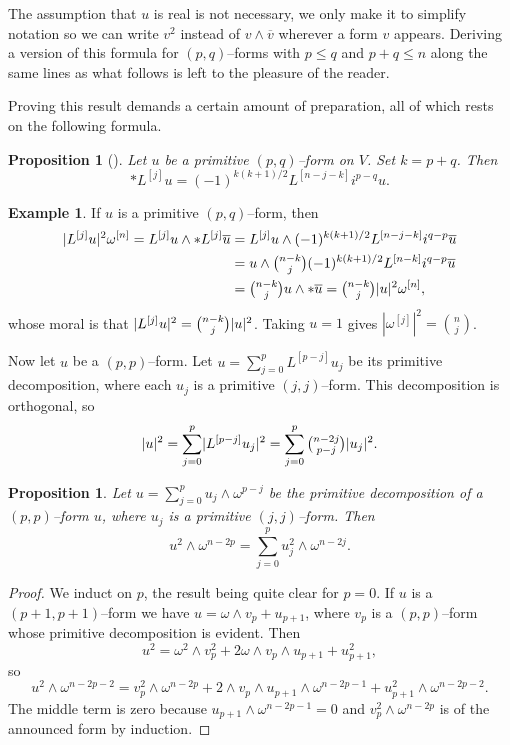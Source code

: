 \documentclass[11pt,a4paper]{amsart}
\def\^#1{^{[#1]}}
\newtheorem{prop}[theo]{Proposition}
\theoremstyle{definition}
\newtheorem{exam}[theo]{Example}
\numberwithin{equation}{section}
\begin{document}
The assumption that $u$ is real is not necessary, we only make it to
simplify notation so we can write $v^2$ instead of $v \wedge \overline v$
wherever a form $v$ appears. Deriving a version of this formula for
$(p,q)$--forms with $p \leq q$ and $p+q \leq n$ along the same lines as
what follows is left to the pleasure of the reader.

Proving this result demands a certain amount of preparation, all of which
rests on the following formula.


\begin{prop}[{{\cite[Proposition~1.67]{Huy}}}]
Let $u$ be a primitive $(p,q)$--form on $V$. Set $k = p+q$. Then
$$
    * L\^{j} u = (-1)^{k(k+1)/2} L\^{n-j-k} i^{p-q} u.
$$
\end{prop}


\begin{exam}
If $u$ is a primitive $(p,q)$--form, then
\begin{align*}
\lvert L\^{j} u \rvert^2 \omega\^{n}
= L\^{j} u \wedge * L\^{j} \overline{u}
&= L\^{j} u \wedge (-1)^{k(k+1)/2} L\^{n-j-k} i^{q-p} \overline{u} \\
&= u \wedge \tbinom{n-k}{j} (-1)^{k(k+1)/2} L\^{n-k} i^{q-p} \overline{u} \\
&= \tbinom{n-k}{j} u \wedge * \overline{u}
= \tbinom{n-k}{j} \lvert u \rvert^2 \omega\^{n},
\end{align*}
whose moral is that $\lvert L\^{j} u \rvert^2 = \tbinom{n-k}{j} \lvert u
\rvert^2$. Taking $u = 1$ gives $|\omega\^{j}|^2 = \binom{n}{j}$.
\end{exam}


Now let $u$ be a $(p,p)$--form. Let $u = \sum_{j=0}^p L\^{p-j} u_j$ be its primitive decomposition, where each $u_j$ is a primitive $(j,j)$--form. This decomposition is orthogonal, so
$$
\lvert u \rvert^2
= \sum_{j=0}^p \lvert L\^{p-j} u_j \rvert^2
= \sum_{j=0}^p \tbinom{n-2j}{p-j} \lvert u_j \rvert^2.
$$


\begin{prop}
  \label{16}
  Let $u = \sum_{j=0}^p u_j \wedge \omega^{p-j}$ be the primitive
decomposition of a $(p,p)$--form $u$, where $u_j$ is a primitive
$(j,j)$--form. Then
$$
u^2 \wedge \omega^{n-2p}
= \sum_{j=0}^p u_j^2 \wedge \omega^{n-2j}.
$$
\end{prop}

\begin{proof}
  We induct on $p$, the result being quite clear for $p = 0$. If $u$ is
  a $(p+1,p+1)$--form  we have $u = \omega \wedge v_p + u_{p+1}$, where
  $v_p$ is a $(p,p)$--form whose primitive decomposition is evident. Then
$$
u^2 = \omega^2 \wedge v_p^2 + 2 \omega \wedge v_p \wedge u_{p+1} +
u_{p+1}^2,
$$
so
$$
u^2 \wedge \omega^{n-2p-2}
= v_p^2 \wedge \omega^{n-2p}
+ 2 \wedge v_p \wedge u_{p+1} \wedge \omega^{n-2p-1}
+ u_{p+1}^2 \wedge \omega^{n-2p-2}.
$$
The middle term is zero because $u_{p+1} \wedge \omega^{n-2p-1} = 0$
and $v_p^2 \wedge \omega^{n-2p}$ is of the announced form by induction.
\end{proof}
\end{document}
